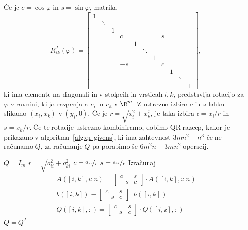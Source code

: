 
Če je $c = \cos \varphi$ in $s = \sin \varphi$, matrika
\[
  R_{ik}^T(\varphi)
  =
  \begin{bmatrix}
	1 &  &  &  &  &  &  &  &  &  &  \\
	  & \ddots &  &  &  &  &  &  &  &  &  \\
	  &  & 1 &  &  &  &  &  &  &  &  \\
	  &  &  & c &  &  &  & s &  &  &  \\
	  &  &  &  & 1 &  &  &  &  &  &  \\
	  &  &  &  &  & \ddots &  &  &  &  &  \\
	  &  &  &  &  &  & 1 &  &  &  &  \\
	  &  &  & -s &  &  &  & c &  &  &  \\
	  &  &  &  &  &  &  &  & 1 &  &  \\
	  &  &  &  &  &  &  &  &  & \ddots &  \\
	  &  &  &  &  &  &  &  &  &  & 1
  \end{bmatrix},
\]
ki ima elemente na diagonali in v stolpcih in vrsticah $i, k$, predstavlja
rotacijo za $\varphi$ v ravnini, ki jo razpenjata $e_i$ in $e_k$ v $\R^m$.
Z ustrezno izbiro $c$ in $s$ lahko slikamo $(x_i, x_k)$ v $(y_i, 0)$.
Če je $r = \sqrt{x_i^2 + x_k^2}$, je taka izbira $c = x_i/r$ in $s = x_k/r$.
Če te rotacije ustrezno kombiniramo, dobimo QR razcep, kakor je prikazano v
algoritmu~\ref{alg:qr-givens}, ki ima zahtevnost $3 mn^2 - n^3$ če ne računamo
$Q$, za računanje $Q$ pa porabimo še $6 m^2 n - 3 mn^2$ operacij.

\begin{algorithm}
  \caption{QR razcep z Givensonovimi rotacijami}
  \label{alg:qr-givens}
  \begin{algorithmic}
	\State $Q = I_m$
	\State $r = \sqrt{a_{ii}^2 + a_{ki}^2}$
	\State $c = \nicefrac{a_{ii}}{r}$
	\State $s = \nicefrac{a_{ik}}{r}$
	\State Izračunaj
	\begin{gather*}
	  A([i,k], i:n) =
	  \begin{bmatrix}
		c & s \\ -s & c
	  \end{bmatrix}
	  \cdot
	  A([i, k], i:n)
	  \\
	  b([i, k]) =
	  \begin{bmatrix}
		c & s \\ -s & c
	  \end{bmatrix}
	  \cdot b([i, k])
	  \\
	  Q([i, k], :) =
	  \begin{bmatrix}
		c & s \\ -s & c
	  \end{bmatrix}
	  \cdot Q([i, k], :)
	\end{gather*}
	\EndFor
	\EndFor
	\State $Q = Q^T$
  \end{algorithmic}
\end{algorithm}

